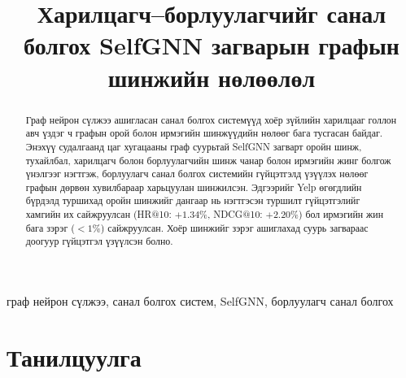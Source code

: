 \documentclass[conference]{IEEEtran}
\begin{document}

\title{Харилцагч–борлуулагчийг санал болгох SelfGNN загварын графын шинжийн нөлөөлөл\\}

\author{
\and
{}
}

\maketitle
\renewcommand{\abstractname}{Хураангуй}
\begin{abstract}
Граф нейрон сүлжээ ашигласан санал болгох системүүд хоёр зүйлийн харилцааг голлон авч үздэг ч графын орой болон ирмэгийн  шинжүүдийн нөлөөг бага тусгасан байдаг. Энэхүү судалгаанд цаг хугацааны граф суурьтай SelfGNN загварт оройн шинж, тухайлбал, харилцагч болон борлуулагчийн шинж чанар болон ирмэгийн жинг болгож үнэлгээг нэгтгэж, борлуулагч санал болгох системийн гүйцэтгэлд үзүүлэх нөлөөг графын дөрвөн хувилбараар харьцуулан шинжилсэн. Эдгээрийг Yelp өгөгдлийн бүрдэлд туршихад оройн шинжийг дангаар нь нэгтгэсэн туршилт гүйцэтгэлийг хамгийн их сайжруулсан (HR@10: $+1.34\%$, NDCG@10: $+2.20\%$) бол ирмэгийн жин бага зэрэг ($<1\%$) сайжруулсан. Хоёр шинжийг зэрэг ашиглахад суурь загвараас доогуур гүйцэтгэл үзүүлсэн болно.
\end{abstract}

\begin{IEEEkeywords}
граф нейрон сүлжээ, санал болгох систем, SelfGNN, борлуулагч санал болгох
\end{IEEEkeywords}

\section{Танилцуулга}
\end{document}
